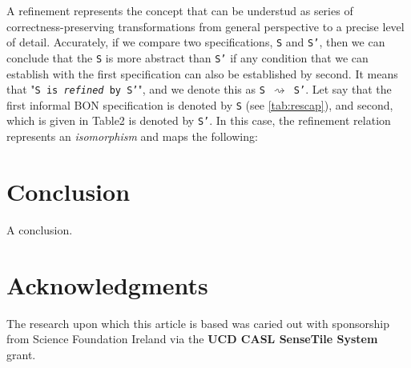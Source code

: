 \documentclass{article}
\begin{document}
A refinement represents the concept that can be understud as series of 
correctness-preserving transformations from general perspective to 
a precise level of detail. Accurately, if we compare two specifications,
\texttt{S} and \texttt{S'}, then we can conclude that the \texttt{S} 
is more abstract than \texttt{S'} if any condition that we can establish 
with the first specification can also be established by second. 
It means that "\texttt{S is \emph{refined} by S'}", 
and we denote this  as \texttt{S $\rightsquigarrow$ S'}.
Let say that the first informal BON specification is denoted by 
\texttt{S} (see \autoref{tab:rescap}), and second, which is given 
in Table2  is denoted by \texttt{S'}.
In this case, the refinement relation represents an \emph{isomorphism} 
and maps the following:
\section{Conclusion}

A conclusion.

\section {Acknowledgments}
The research upon which this article is based was caried out with
sponsorship from Science Foundation Ireland via the
\textbf{UCD CASL SenseTile System} grant.






%
%
%
%
%
%
%
%
%
%
%
%
%
%
%
%
%
%
%
%
%
%
%
%

\end{document}
